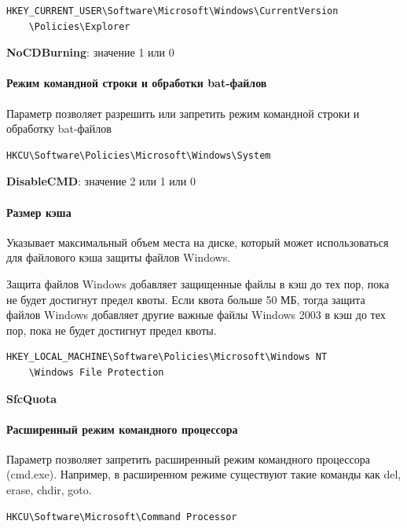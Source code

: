 \documentclass[russian,utf8,emptystyle]{eskdtext}
\begin{document}
\begin{verbatim}
HKEY_CURRENT_USER\Software\Microsoft\Windows\CurrentVersion
    \Policies\Explorer
\end{verbatim}

\textbf{NoCDBurning}: значение 1 или 0


\paragraph{Режим командной строки и обработки bat-файлов}

Параметр позволяет разрешить или запретить режим командной строки и обработку bat-файлов

\begin{verbatim}
HKCU\Software\Policies\Microsoft\Windows\System
\end{verbatim}

\textbf{DisableCMD}: значение 2 или 1 или 0 


\paragraph{Размер кэша}

Указывает максимальный объем места на диске, который может использоваться для файлового кэша защиты файлов Windows.

Защита файлов Windows добавляет защищенные файлы в кэш до тех пор, пока не будет достигнут предел квоты. Если квота больше 50 МБ, тогда защита файлов Windows добавляет другие важные файлы Windows 2003 в кэш до тех пор, пока не будет достигнут предел квоты. 

\begin{verbatim}
HKEY_LOCAL_MACHINE\Software\Policies\Microsoft\Windows NT
    \Windows File Protection
\end{verbatim}

\textbf{SfcQuota}


\paragraph{Расширенный режим командного процессора}

Параметр позволяет запретить расширенный режим командного процессора (cmd.exe). Например, в расширенном режиме существуют такие команды как del, erase, chdir, goto.

\begin{verbatim}
HKCU\Software\Microsoft\Command Processor
\end{verbatim}
\end{document}
